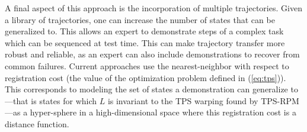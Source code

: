 A final aspect of this approach is the incorporation of multiple trajectories. Given a library of trajectories,
one can increase the number of states that can be generalized to. This allows an expert to demonstrate steps of a complex task
which can be sequenced at test time. This can make trajectory transfer more robust and reliable, as an expert can also
include demonstrations to recover from common failures. Current approaches use the nearest-neighbor with respect to registration
cost (the value of the optimization problem defined in (\ref{eq:tps})). This corresponds to modeling the set of states a demonstration
can generalize to---that is states for which $L$ is invariant to the TPS warping found by TPS-RPM---as a hyper-sphere 
in a high-dimensional space where this registration cost is a distance function.


